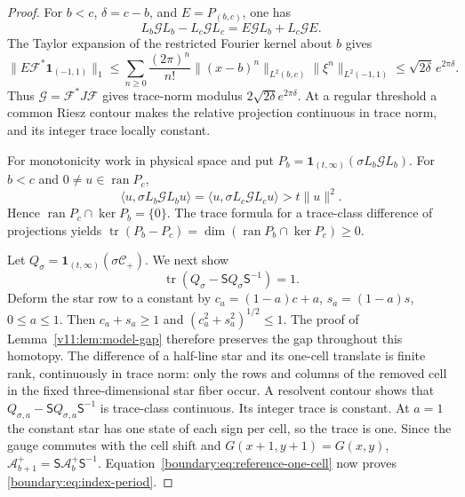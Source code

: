 \begin{proof}
For $b<c$, $\delta=c-b$, and $E=P_{(b,c)}$, one has
\[
 L_b\mathcal G L_b-L_c\mathcal G L_c
 =E\mathcal G L_b+L_c\mathcal G E.
\]
The Taylor expansion of the restricted Fourier kernel about $b$ gives
\[
 \|E\mathcal F^*\mathbf1_{(-1,1)}\|_1
 \le\sum_{n\ge0}\frac{(2\pi)^n}{n!}
 \|(x-b)^n\|_{L^2(b,c)}\|\xi^n\|_{L^2(-1,1)}
 \le\sqrt{2\delta}\,e^{2\pi\delta}.
\]
Thus $\mathcal G=\mathcal F^*J\mathcal F$ gives trace-norm modulus
$2\sqrt{2\delta}e^{2\pi\delta}$. At a regular threshold a common
Riesz contour makes the relative projection continuous in trace norm,
and its integer trace locally constant.

For monotonicity work in physical space and put
$P_b=\mathbf1_{(t,\infty)}(\sigma L_b\mathcal G L_b)$.
For $b<c$ and $0\ne u\in\operatorname{ran}P_c$,
\[
 \langle u,\sigma L_b\mathcal G L_bu\rangle
 =\langle u,\sigma L_c\mathcal G L_cu\rangle>t\|u\|^2.
\]
Hence $\operatorname{ran}P_c\cap\ker P_b=\{0\}$.  The trace formula
for a trace-class difference of projections yields
$\operatorname{tr}(P_b-P_c)
=\dim(\operatorname{ran}P_b\cap\ker P_c)\ge0$.

Let $Q_\sigma=\mathbf1_{(t,\infty)}(\sigma\mathscr C_+)$.
We next show
\begin{equation}\label{boundary:eq:reference-one-cell}
 \operatorname{tr}(Q_\sigma-\mathsf S Q_\sigma\mathsf S^{-1})=1.
\end{equation}
Deform the star row to a constant by
$c_a=(1-a)c+a$, $s_a=(1-a)s$, $0\le a\le1$.
Then $c_a+s_a\ge1$ and $(c_a^2+s_a^2)^{1/2}\le1$.
The proof of Lemma~\ref{v11:lem:model-gap} therefore preserves the
gap throughout this homotopy.  The difference of a half-line star
and its one-cell translate is finite rank, continuously in trace norm:
only the rows and columns of the removed cell in the fixed
three-dimensional star fiber occur.  A resolvent contour shows that
$Q_{\sigma,a}-\mathsf S Q_{\sigma,a}\mathsf S^{-1}$ is trace-class
continuous.  Its integer trace is constant.  At $a=1$ the constant
star has one state of each sign per cell, so the trace is one.
Since the gauge commutes with the cell shift and $G(x+1,y+1)=G(x,y)$,
$\mathscr A_{b+1}^+=\mathsf S\mathscr A_b^+\mathsf S^{-1}$.
Equation~\eqref{boundary:eq:reference-one-cell} now proves
\eqref{boundary:eq:index-period}.


\end{proof}
